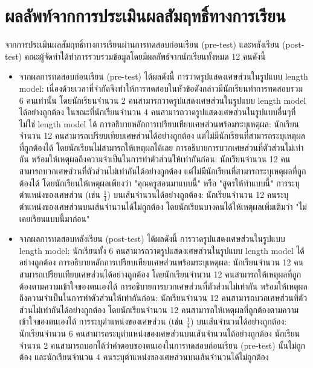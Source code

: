 \section{ผลลัพท์จากการประเมินผลสัมฤทธิ์ทางการเรียน}
จากการประเมินผลสัมฤทธิ์ทางการเรียนผ่านการทดสอบก่อนเรียน (pre-test) และหลังเรียน (post-test) คณะผู้จัดทำได้ทำการรวบรวมข้อมูลโดยมีผลลัพธ์จากนักเรียนทั้งหมด 12 คนดังนี้
\begin{itemize}
    \item จากผลการทดสอบก่อนเรียน (pre-test) ได้ผลดังนี้
        \subitem การวาดรูปแสดงเศษส่วนในรูปแบบ length model: เนื่องด้วยเวลาที่จำกัดจึงทำให้การทดสอบในหัวข้อดังกล่าวมีนักเรียนทำการทดสอบรวม 6 คนเท่านั้น โดยนักเรียนจำนวน 2 คนสามารถวาดรูปแสดงเศษส่วนในรูปแบบ length model ได้อย่างถูกต้อง ในขณะที่นักเรียนจำนวน 4 คนสามารถวาดรูปแสดงเศษส่วนในรูปแบบอื่นๆที่ไม่ใช่ length model ได้
        \subitem การอธิบายหลักการเปรียบเทียบเศษส่วนพร้อมระบุเหตุผล: นักเรียนจำนวน 12 คนสามารถเปรียบเทียบเศษส่วนได้อย่างถูกต้อง แต่ไม่มีนักเรียนที่สามารถระบุเหตุผลที่ถูกต้องได้ โดยนักเรียนไม่สามารถให้เหตุผลได้เลย
        \subitem การอธิบายการบวกเศษส่วนที่ตัวส่วนไม่เท่ากัน พร้อมให้เหตุผลถึงความจำเป็นในการทำตัวส่วนให้เท่ากันก่อน: นักเรียนจำนวน 12 คนสามารถบวกเศษส่วนที่ตัวส่วนไม่เท่ากันได้อย่างถูกต้อง แต่ไม่มีนักเรียนที่สามารถระบุเหตุผลที่ถูกต้องได้ โดยนักเรียนให้เหตุผลเพียงว่า "คุณครูสอนมาแบบนี้" หรือ "สูตรให้ทำแบบนี้"
        \subitem การระบุตำแหน่งของเศษส่วน (เช่น $\frac{1}{4}$) บนเส้นจำนวนได้อย่างถูกต้อง: นักเรียนจำนวน 12 คนระบุตำแหน่งของเศษส่วนบนเส้นจำนวนได้ไม่ถูกต้อง โดยนักเรียนบางคนได้ให้เหตุผลเพิ่มเติมว่า "ไม่เคยเรียนแบบนี้มาก่อน"
    \item จากผลการทดสอบหลังเรียน (post-test) ได้ผลดังนี้
        \subitem การวาดรูปแสดงเศษส่วนในรูปแบบ length model: นักเรียนทั้ง 6 คนสามารถวาดรูปแสดงเศษส่วนในรูปแบบ length model ได้อย่างถูกต้อง
        \subitem การอธิบายหลักการเปรียบเทียบเศษส่วนพร้อมระบุเหตุผล: นักเรียนจำนวน 12 คนสามารถเปรียบเทียบเศษส่วนได้อย่างถูกต้อง โดยนักเรียนจำนวน 12 คนสามารถให้เหตุผลที่ถูกต้องตามความเข้าใจของตนเองได้
        \subitem การอธิบายการบวกเศษส่วนที่ตัวส่วนไม่เท่ากัน พร้อมให้เหตุผลถึงความจำเป็นในการทำตัวส่วนให้เท่ากันก่อน: นักเรียนจำนวน 12 คนสามารถบวกเศษส่วนที่ตัวส่วนไม่เท่ากันได้อย่างถูกต้อง โดยนักเรียนจำนวน 12 คนสามารถให้เหตุผลที่ถูกต้องตามความเข้าใจของตนเองได้
        \subitem การระบุตำแหน่งของเศษส่วน (เช่น $\frac{1}{4}$) บนเส้นจำนวนได้อย่างถูกต้อง: นักเรียนจำนวน 6 คนสามารถระบุตำแหน่งของเศษส่วนบนเส้นจำนวนได้อย่างถูกต้อง นักเรียนจำนวน 2 คนสามารถบอกได้ว่าคำตอบของตนเองในการทดสอบก่อนเรียน (pre-test) นั้นไม่ถูกต้อง และนักเรียนจำนวน 4 คนระบุตำแหน่งของเศษส่วนบนเส้นจำนวนได้ไม่ถูกต้อง
\end{itemize}

